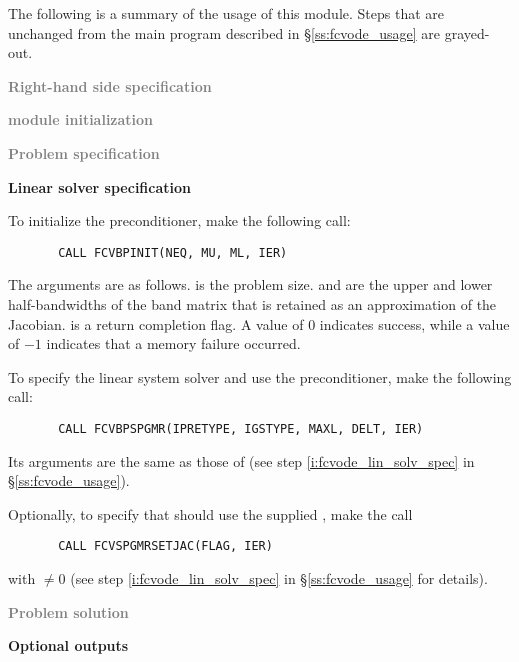 The following is a summary of the usage of this module. Steps that are unchanged
from the main program described in \S\ref{ss:fcvode_usage} are grayed-out.

\begin{Steps}
  
\item \textcolor{gray}{\bf Right-hand side specification}

\item \textcolor{gray}{\bf {\nvector} module initialization}

\item \textcolor{gray}{\bf Problem specification}

\item {\bf Linear solver specification}

  To initialize the {\cvbandpre} preconditioner, make the following call:
\begin{verbatim}
       CALL FCVBPINIT(NEQ, MU, ML, IER)
\end{verbatim}
  The arguments are as follows.
   is the problem size.
   and  are the upper and lower half-bandwidths of the band matrix
  that  is retained as an approximation of the Jacobian.
   is a return completion flag.  A value of $0$ indicates success, while 
  a value of $-1$ indicates that a memory failure occurred.
  
  To specify the {\spgmr} linear system solver and use the {\cvbandpre}
  preconditioner, make the following call:
\begin{verbatim}
       CALL FCVBPSPGMR(IPRETYPE, IGSTYPE, MAXL, DELT, IER)
\end{verbatim}
  Its arguments are the same as those of 
  (see step \ref{i:fcvode_lin_solv_spec} in \S\ref{ss:fcvode_usage}).
  

  Optionally, to specify that {\spgmr} should use the supplied , 
  make the call
\begin{verbatim}
       CALL FCVSPGMRSETJAC(FLAG, IER)
\end{verbatim}
  with $\neq 0$ 
  (see step \ref{i:fcvode_lin_solv_spec} in \S\ref{ss:fcvode_usage} for details).
  
\item \textcolor{gray}{\bf Problem solution}
  
\item {\bf {\cvbbdpre} Optional outputs}
  

\end{Steps}
